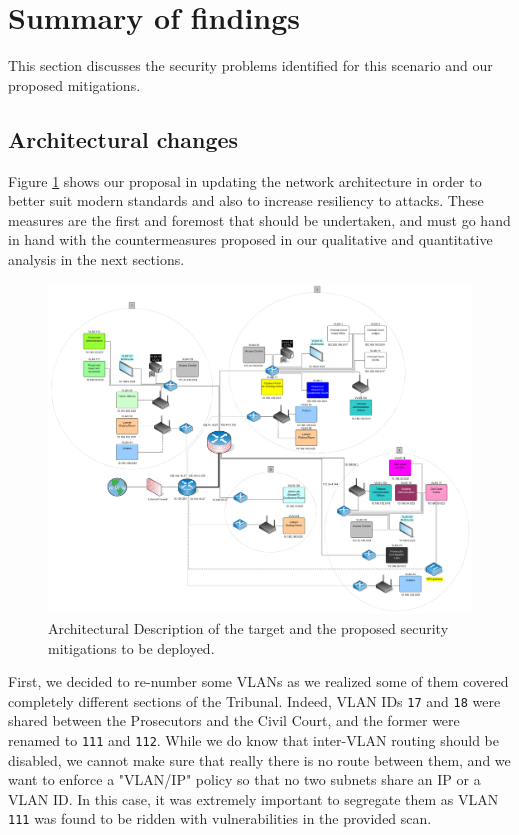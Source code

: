 \section{Summary of findings}
\label{sec:summary-findings}

This section discusses the security problems identified for this scenario and our proposed mitigations.

\subsection{Architectural changes}

Figure \ref{fig:updated-network} shows our proposal in updating the network architecture in order to better suit modern standards and also to increase resiliency to attacks. These measures are the first and foremost that should be undertaken, and must go hand in hand with the countermeasures proposed in our qualitative and quantitative analysis in the next sections.

\begin{figure}[!h]
	\centering
	\includegraphics[width=\textwidth]{drawable/rete-updated.png}
	\caption{Architectural Description of the target and the proposed security mitigations to be deployed.}
	\label{fig:updated-network}
\end{figure}

First, we decided to re-number some VLANs as we realized some of them covered completely different sections of the Tribunal. Indeed, VLAN IDs \verb=17= and \verb=18= were shared between the Prosecutors and the Civil Court, and the former were renamed to \verb=111= and \verb=112=. While we do know that inter-VLAN routing should be disabled, we cannot make sure that really there is no route between them, and we want to enforce a "VLAN/IP" policy so that no two subnets share an IP or a VLAN ID. In this case, it was extremely important to segregate them as VLAN \verb=111= was found to be ridden with vulnerabilities in the provided scan.

